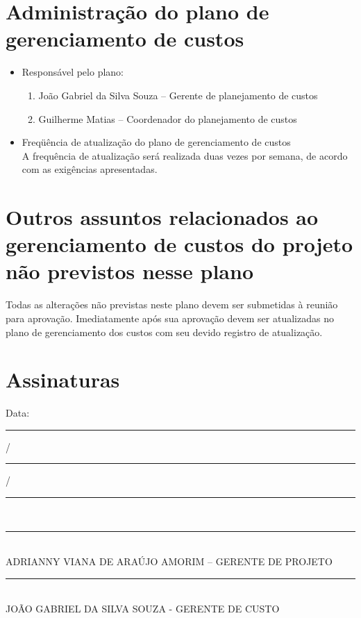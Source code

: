 \section*{Administração do plano de gerenciamento de custos}
\begin{itemize}

\item Responsável pelo plano:

\begin{enumerate}
\item João Gabriel da Silva Souza – Gerente de planejamento de custos
\item Guilherme Matias – Coordenador do planejamento de custos
\end{enumerate}

\item Freqüência de atualização do plano de gerenciamento de custos\\

A frequência de atualização será realizada duas vezes por semana, de acordo com as exigências apresentadas.
\end{itemize}

\section*{Outros assuntos relacionados ao gerenciamento de custos do projeto não previstos nesse plano}
Todas as alterações não previstas neste plano devem ser submetidas à reunião para aprovação. Imediatamente após sua aprovação devem ser atualizadas no plano de gerenciamento dos custos com seu devido registro de atualização.

\section*{Assinaturas}
\begin{center}
Data: \rule{0.5cm}{0.1mm}/\rule{0.5cm}{0.1mm}/\rule{1cm}{0.1mm}     \\
\rule{13cm}{0.1mm}\\
ADRIANNY VIANA DE ARAÚJO AMORIM – GERENTE DE PROJETO\\
\rule{13cm}{0.1mm}\\
JOÃO GABRIEL DA SILVA SOUZA - GERENTE DE CUSTO
\end{center}
% 